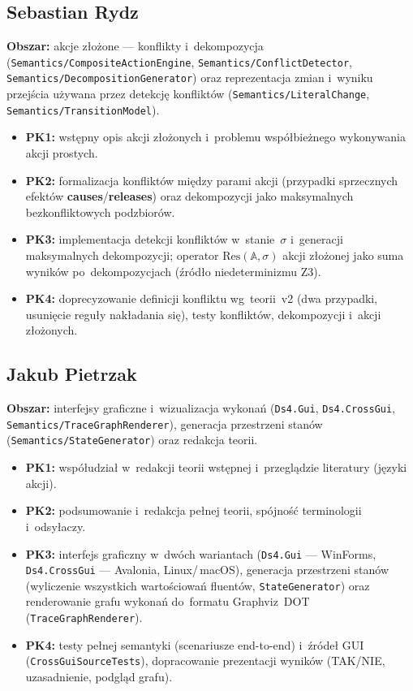 \documentclass[11pt,a4paper]{article}
\newcommand{\Res}{\mathrm{Res}}
\begin{document}
\subsection*{Sebastian Rydz}
\textbf{Obszar:} akcje złożone --- konflikty i~dekompozycja (\texttt{Semantics/CompositeActionEngine}, \texttt{Semantics/ConflictDetector}, \texttt{Semantics/DecompositionGenerator}) oraz reprezentacja zmian i~wyniku przejścia używana przez detekcję konfliktów (\texttt{Semantics/LiteralChange}, \texttt{Semantics/TransitionModel}).
\begin{itemize}\setlength\itemsep{0.1em}
  \item \textbf{PK1:} wstępny opis akcji złożonych i~problemu współbieżnego wykonywania akcji prostych.
  \item \textbf{PK2:} formalizacja konfliktów między parami akcji (przypadki sprzecznych efektów \textbf{causes}/\textbf{releases}) oraz dekompozycji jako maksymalnych bezkonfliktowych podzbiorów.
  \item \textbf{PK3:} implementacja detekcji konfliktów w~stanie~$\sigma$ i~generacji maksymalnych dekompozycji; operator $\Res(\mathbb{A},\sigma)$ akcji złożonej jako suma wyników po~dekompozycjach (źródło niedeterminizmu Z3).
  \item \textbf{PK4:} doprecyzowanie definicji konfliktu wg~teorii~v2 (dwa przypadki, usunięcie reguły nakładania się), testy konfliktów, dekompozycji i~akcji złożonych.
\end{itemize}

\subsection*{Jakub Pietrzak}
\textbf{Obszar:} interfejsy graficzne i~wizualizacja wykonań (\texttt{Ds4.Gui}, \texttt{Ds4.CrossGui}, \texttt{Semantics/TraceGraphRenderer}), generacja przestrzeni stanów (\texttt{Semantics/StateGenerator}) oraz redakcja teorii.
\begin{itemize}\setlength\itemsep{0.1em}
  \item \textbf{PK1:} współudział w~redakcji teorii wstępnej i~przeglądzie literatury (języki akcji).
  \item \textbf{PK2:} podsumowanie i~redakcja pełnej teorii, spójność terminologii i~odsyłaczy.
  \item \textbf{PK3:} interfejs graficzny w~dwóch wariantach (\texttt{Ds4.Gui} --- WinForms, \texttt{Ds4.CrossGui} --- Avalonia, Linux/\,macOS), generacja przestrzeni stanów (wyliczenie wszystkich wartościowań fluentów, \texttt{StateGenerator}) oraz renderowanie grafu wykonań do~formatu Graphviz~DOT (\texttt{TraceGraphRenderer}).
  \item \textbf{PK4:} testy pełnej semantyki (scenariusze end-to-end) i~źródeł GUI (\texttt{CrossGuiSourceTests}), dopracowanie prezentacji wyników (TAK/NIE, uzasadnienie, podgląd grafu).
\end{itemize}
\end{document}
